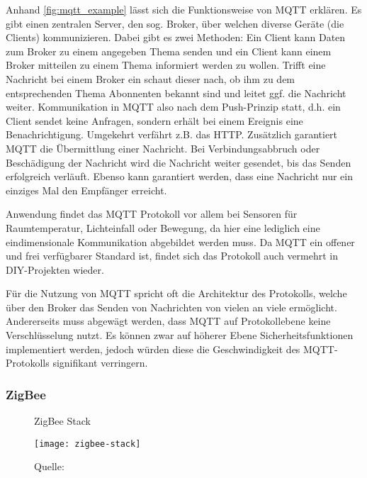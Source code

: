 Anhand \autoref{fig:mqtt_example} lässt sich die Funktionsweise von \ac{MQTT} erklären.
Es gibt einen zentralen Server, den sog. Broker, über welchen diverse Geräte (die Clients) kommunizieren.
Dabei gibt es zwei Methoden:
Ein Client kann Daten zum Broker zu einem angegeben Thema senden und ein Client kann einem Broker mitteilen zu einem Thema informiert werden zu wollen.
Trifft eine Nachricht bei einem Broker ein schaut dieser nach, ob ihm zu dem entsprechenden Thema Abonnenten bekannt sind und leitet ggf. die Nachricht weiter.
Kommunikation in \ac{MQTT} also nach dem Push-Prinzip statt, d.h. ein Client sendet keine Anfragen, sondern erhält bei einem Ereignis eine Benachrichtigung.
Umgekehrt verfährt z.B. das \ac{HTTP}.
Zusätzlich garantiert \ac{MQTT} die Übermittlung einer Nachricht.
Bei Verbindungsabbruch oder Beschädigung der Nachricht wird die Nachricht weiter gesendet, bis das Senden erfolgreich verläuft.
Ebenso kann garantiert werden, dass eine Nachricht nur ein einziges Mal den Empfänger erreicht.

Anwendung findet das \ac{MQTT} Protokoll vor allem bei Sensoren für Raumtemperatur, Lichteinfall oder Bewegung, da hier eine lediglich eine eindimensionale Kommunikation abgebildet werden muss.
Da \ac{MQTT} ein offener und frei verfügbarer Standard ist, findet sich das Protokoll auch vermehrt in \ac{DIY}-Projekten wieder.

Für die Nutzung von \ac{MQTT} spricht oft die Architektur des Protokolls, welche über den Broker das Senden von Nachrichten von vielen an viele ermöglicht.
Andererseits muss abgewägt werden, dass \ac{MQTT} auf Protokollebene keine Verschlüsselung nutzt.
Es können zwar auf höherer Ebene Sicherheitsfunktionen implementiert werden, jedoch würden diese die Geschwindigkeit des \ac{MQTT}-Protokolls signifikant verringern.

\subsubsection{ZigBee}

\begin{wrapfigure}{r}{0.35\textwidth}
	\centering
	\caption{ZigBee Stack}
	\texttt{[image: zigbee-stack]}
	\caption*{\footnotesize{Quelle: }}
	\label{fig:zigbee_stack}
\end{wrapfigure}

